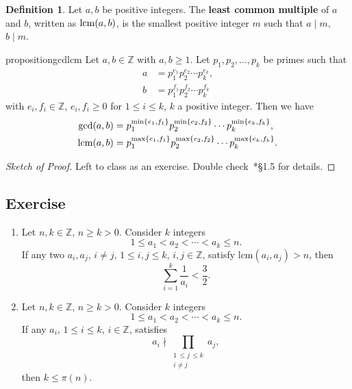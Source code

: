 \documentclass{amsbook}
\theoremstyle{plain}
\theoremstyle{definition}
\newtheorem{definition}[theorem]{Definition}
\theoremstyle{remark}
\numberwithin{equation}{chapter}
\numberwithin{figure}{chapter}
\newcommand{\Z}{\mathbb{Z}}
\begin{document}
\begin{definition}
Let $a, b$ be positive integers. The \textbf{least common multiple} of $a$ and $b$, written as ${\rm lcm} (a, b)$, is the smallest positive integer $m$ such that $a \mid m$, $b \mid m$.
\end{definition}
\begin{restatable}{proposition}{gcdlcm}\label{prop:gcd_lcm} %
Let $a, b \in \mathbb{Z}$ with $a, b \geqslant 1$. Let $p_1, p_2, \ldots, p_k$ be primes such that 
\begin{align}
a &=  p_1^{e_1} p_2^{e_2} \cdots p_k^{e_k}, \\
b &=  p_1^{f_1} p_2^{f_2} \cdots p_k^{f_k}
\end{align}
with $e_i, f_i \in \mathbb{Z}$, $e_i, f_i \geqslant 0$ for $1 \leqslant i \leqslant k$, $k$ a positive integer. Then we have 
\begin{align}
\gcd(a, b) &= p_1^{\min \{e_1, f_1\}} p_2^{\min \{e_2, f_2\}} \cdots p_k^{\min \{e_k, f_k\}}, \\
{\rm lcm}(a, b) &= p_1^{\max \{e_1, f_1\}} p_2^{\max \{e_2, f_2\}} \cdots p_k^{\max \{e_k, f_k\}}.
\end{align}
\end{restatable}
\begin{proof}[Sketch of Proof]\renewcommand*{\qedsymbol}{\ensuremath{\blacksquare}}
Left to class as an exercise. Double check~\cite{Strayer2001}*{\S 1.5} for details.
\end{proof}

\subsection*{Exercise}
\begin{enumerate}
\item Let $n, k \in \Z$, $n \geqslant k > 0$. Consider $k$ integers
  \[
    1 \leqslant a_1 < a_2 < \cdots < a_k \leqslant n.
  \]
  If any two $a_i, a_j$, $i \neq j$, $1 \leqslant i, j \leqslant k$, $i, j \in \Z$, satisfy $\text{lcm} (a_i, a_j) > n$, then
  \[
    \sum_{i = 1}^k \frac{1}{a_i} < \frac{3}2.
  \]
\item Let $n, k \in \Z$, $n \geqslant k > 0$. Consider $k$ integers
  \[
    1 \leqslant a_1 < a_2 < \cdots < a_k \leqslant n.
  \]
  If any $a_i$, $1 \leqslant i \leqslant k$, $i \in \Z$, satisfies
  \[
    a_i \nmid \prod_{\substack{1 \, \leqslant j \, \leqslant k \\ i \neq j}} a_j,
  \]
  then $k \leqslant \pi (n)$.
\end{enumerate}
\end{document}
